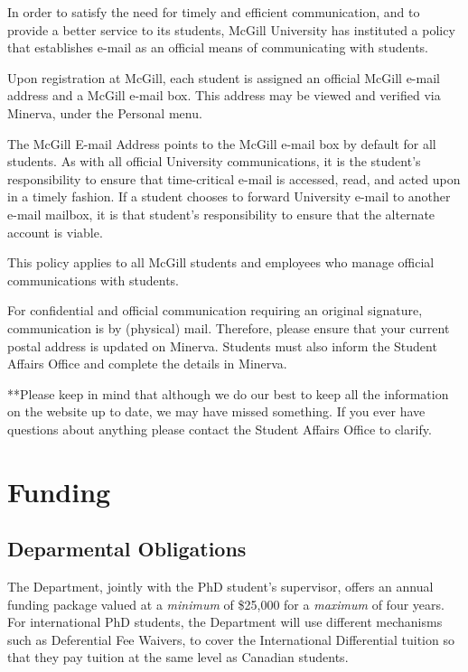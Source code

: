 \documentclass[
]{book}
\begin{document}
In order to satisfy the need for timely and efficient communication, and to provide a better service to its students, McGill University has instituted a policy that establishes e-mail as an official means of communicating with students.

Upon registration at McGill, each student is assigned an official McGill e-mail address and a McGill e-mail box. This address may be viewed and verified via Minerva, under the Personal menu.

The McGill E-mail Address points to the McGill e-mail box by default for all students. As with all official University communications, it is the student's responsibility to ensure that time-critical e-mail is accessed, read, and acted upon in a timely fashion. If a student chooses to forward University e-mail to another e-mail mailbox, it is that student's responsibility to ensure that the alternate account is viable.

This policy applies to all McGill students and employees who manage official communications with students.

For confidential and official communication requiring an original signature, communication is by (physical) mail. Therefore, please ensure that your current postal address is updated on Minerva. Students must also inform the Student Affairs Office and complete the details in Minerva.

**Please keep in mind that although we do our best to keep all the information on the website up to date, we may have missed something. If you ever have questions about anything please contact the Student Affairs Office to clarify.

\hypertarget{funding}{%
\chapter{Funding}\label{funding}}

\hypertarget{deparmental-obligations}{%
\section{Deparmental Obligations}\label{deparmental-obligations}}

The Department, jointly with the PhD student's supervisor, offers an annual funding package valued at a \emph{minimum} of \$25,000 for a \emph{maximum} of four years. For international PhD students, the Department will use different mechanisms such as Deferential Fee Waivers, to cover the International Differential tuition so that they pay tuition at the same level as Canadian students.
\end{document}
